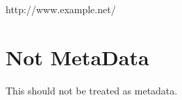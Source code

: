 http:\slash \slash www.example.net\slash 

\part{Not MetaData}
\label{notmetadata}

This should not be treated as metadata.
